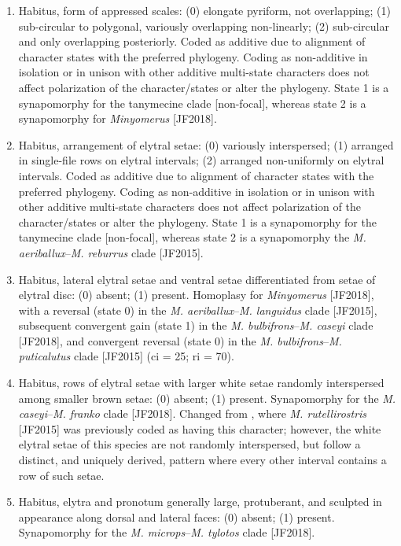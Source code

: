 \documentclass[fleqn,10pt,lineno]{wlpeerj} %
\begin{document}
	\begin{enumerate}
		\item Habitus, form of appressed scales: (0) elongate pyriform, not overlapping; (1) sub-circular to polygonal, variously overlapping non-linearly; (2) sub-circular and only overlapping posteriorly. Coded as additive due to alignment of character states with the preferred phylogeny. Coding as non-additive in isolation or in unison with other additive multi-state characters does not affect polarization of the character/states or alter the phylogeny. State 1 is a synapomorphy for the tanymecine clade [non-focal], whereas state 2 is a synapomorphy for \textit{Minyomerus} [JF2018].
	 	
		\item Habitus, arrangement of elytral setae: (0) variously interspersed; (1) arranged in single-file rows on elytral intervals; (2) arranged non-uniformly on elytral intervals. Coded as additive due to alignment of character states with the preferred phylogeny. Coding as non-additive in isolation or in unison with other additive multi-state characters does not affect polarization of the character/states or alter the phylogeny. State 1 is a synapomorphy for the tanymecine clade [non-focal], whereas state 2 is a synapomorphy the \textit{M. aeriballux}--\textit{M. reburrus} clade [JF2015].
		
		\item Habitus, lateral elytral setae and ventral setae differentiated from setae of elytral disc: (0) absent; (1) present. Homoplasy for \textit{Minyomerus} [JF2018], with a reversal (state 0) in the \textit{M. aeriballux}--\textit{M. languidus} clade [JF2015], subsequent convergent gain (state 1) in the \textit{M. bulbifrons}--\textit{M. caseyi} clade [JF2018], and convergent reversal (state 0) in the \textit{M. bulbifrons}--\textit{M. puticalutus} clade [JF2015] (ci = 25; ri = 70).
	 	
	 	\item Habitus, rows of elytral setae with larger white setae randomly interspersed among smaller brown setae: (0) absent; (1) present. Synapomorphy for the \textit{M. caseyi}--\textit{M. franko} clade [JF2018]. Changed from \citet{jansen2015}, where \textit{M. rutellirostris} [JF2015] was previously coded as having this character; however, the white elytral setae of this species are not randomly interspersed, but follow a distinct, and uniquely derived, pattern where every other interval contains a row of such setae.
	 	
	 	\item Habitus, elytra and pronotum generally large, protuberant, and sculpted in appearance along dorsal and lateral faces: (0) absent; (1) present. Synapomorphy for the \textit{M. microps}--\textit{M. tylotos} clade [JF2018].
	 	

\end{enumerate}
\end{document}

